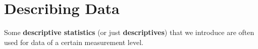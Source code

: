 \section{Describing Data \cite{statistics/book/Statistics-for-Data-Scientists/Maurits-Kaptein}} \label{Data/Describing Data}

Some \textbf{descriptive statistics}\label{Data/Describing Data/descriptive statistics} (or just \textbf{descriptives}\label{Data/Describing Data/descriptives}) that we introduce are often used for data of a certain measurement level. \hfill \cite{statistics/book/Statistics-for-Data-Scientists/Maurits-Kaptein}

















